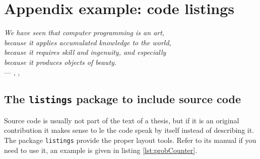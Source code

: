 \chapter{Appendix example: code listings}

\begin{flushright}{\slshape    
    We have seen that computer programming is an art, \\ 
    because it applies accumulated knowledge to the world, \\ 
    because it requires skill and ingenuity, and especially \\
    because it produces objects of beauty.} \\ \medskip
    --- \citeauthor{knuth:1974}, ,
\citeyear{knuth:1974} 
\end{flushright}

\section{The \texttt{listings} package to include source code}
Source code is usually not part of the text of a thesis, but if it is an original contribution it makes sense to le the code speak by itself instead of describing it. The package \verb!listings! provide the proper layout tools. Refer to its manual if you need to use it, an example is given in listing \ref{lst:probCounter}.

